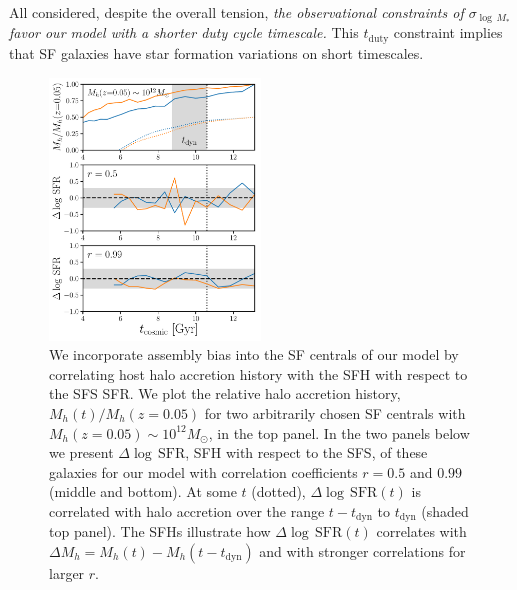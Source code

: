 \documentclass[12pt, letterpaper, preprint, tighten]{aastex62}
\begin{document}
All considered, despite the overall tension, {\em the observational 
constraints of $\sigma_{\log\,M_*}$ favor our model with a shorter duty cycle 
timescale.} %
This $t_\mathrm{duty}$ constraint implies that SF galaxies have star formation 
variations on short timescales. %

\begin{figure}
\begin{center}
\includegraphics[width=0.5\textwidth]{figs/Mhacc_dSFR.pdf}
\caption{We incorporate assembly bias into the SF centrals of our model by 
    correlating host halo accretion history with the SFH with respect to the 
    SFS SFR. We plot the relative halo accretion history, $M_h(t)/M_h(z{=}0.05)$ 
    for two arbitrarily chosen SF centrals with $M_h(z{=}0.05)\sim10^{12}M_\odot$, 
    in the top panel. In the two panels below we present $\Delta\log\,\mathrm{SFR}$, 
    SFH with respect to the SFS, of these galaxies for our model with correlation 
    coefficients $r=0.5$ and $0.99$ (middle and bottom). At some $t$ (dotted), 
    $\Delta\log\,\mathrm{SFR}(t)$ is correlated with halo accretion over the 
    range $t - t_\mathrm{dyn}$ to $t_\mathrm{dyn}$ (shaded top panel). The 
    SFHs illustrate how $\Delta\log\,\mathrm{SFR}(t)$ correlates with 
    $\Delta M_h = M_h(t) - M_h(t-t_\mathrm{dyn})$ and with stronger correlations 
    for larger $r$.}
\label{fig:mhacc_dsfr}
\end{center}
\end{figure}
\end{document}

